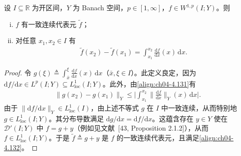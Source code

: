 \documentclass[../../main.tex]{subfiles}%
\begin{document}
\begin{lemma}\label{lemma:ch04-绝对连续代表}
设 $I\subseteq\mathbb{R}$ 为开区间，$Y$ 为 Banach 空间，$p\in[1,\infty]$，$f\in W^{1,p}(I;Y)$。则
\begin{enumerate}[(i)]
\item\label{item:ch04-绝对连续代表-i} $f$ 有一致连续代表元 $\tilde f$；
\item\label{item:ch04-绝对连续代表-ii} 对任意 $x_1,x_2\in I$ 有
\begin{align}
\tilde f(x_2)-\tilde f(x_1)=\int_{x_1}^{x_2}\frac{\mathrm{d}f}{\mathrm{d}x}(x)\,\mathrm{d}x. \label{align:ch04-4.132}
\end{align}
\end{enumerate}
\end{lemma}

\begin{proof}
令 $g(\xi)\triangleq\int_{\bar x}^{\xi}\frac{\mathrm{d}f}{\mathrm{d}x}(x)\,\mathrm{d}x$（$\bar x,\xi\in I$）。此定义良定，因为 $\mathrm{d}f/\mathrm{d}x\in L^p(I;Y)\subseteq L^1_{\mathrm{loc}}(I;Y)$。此外，由\eqref{align:ch04-4.131}有
\begin{align*}
\|g(x_2)-g(x_1)\|_Y\leqslant\Big|\int_{x_1}^{x_2}\Big\|\frac{\mathrm{d}f}{\mathrm{d}x}\Big\|_Y(x)\,\mathrm{d}x\Big|.
\end{align*}
由于 $\|\mathrm{d}f/\mathrm{d}x\|_Y\in L^1_{\mathrm{loc}}(I)$，由上述不等式 $g$ 在 $I$ 中一致连续，从而特别地 $g\in L^1_{\mathrm{loc}}(I;Y)$。其分布导数满足 $\mathrm{d}g/\mathrm{d}x=\mathrm{d}f/\mathrm{d}x$。这蕴含存在 $y\in Y$ 使在 $\mathcal{D}'(I;Y)$ 中 $f=g+y$（例如见文献~[43, Proposition 2.1.2]），从而 $f\in L^1_{\mathrm{loc}}(I;Y)$。于是 $\tilde f\triangleq g+y$ 是 $f$ 的一致连续代表元，且满足\eqref{align:ch04-4.132}。
\end{proof}
\end{document}
